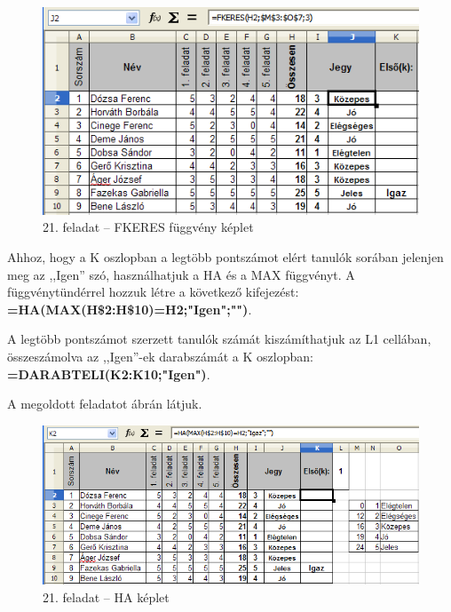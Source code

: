 \begin{figure}[!h]
\begin{center}
\includegraphics[width=13.333cm]{oocalcv2-img99.png}
\caption{21. feladat --  FKERES függvény képlet}\label{21-feladatVLOOKUPKéplet}
\end{center}
\end{figure}

Ahhoz, hogy a K oszlopban a legtöbb pontszámot elért tanulók
sorában jelenjen meg az ,,Igen''
szó, használhatjuk a HA és a MAX függvényt. A
függvénytündérrel hozzuk létre a következő
kifejezést:
\textsf{\textbf{=HA(MAX(H\$2:H\$10)=H2;"Igen";"")}}.

A legtöbb pontszámot szerzett tanulók számát
kiszámíthatjuk az L1 cellában, összeszámolva az
,,Igen''-ek darabszámát a K oszlopban:
\textsf{\textbf{=DARABTELI(K2:K10;"Igen")}}.

A megoldott feladatot  ábrán látjuk.

\begin{figure}[!h]
\begin{center}
\includegraphics[width=15.999cm]{oocalcv2-img100.png}
\caption{21.  feladat --  HA képlet}\label{21-feladatIF}
\end{center}
\end{figure}

